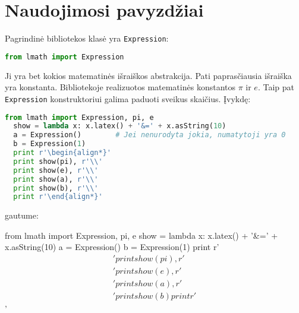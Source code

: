 \chapter{Naudojimosi pavyzdžiai}

Pagrindinė bibliotekos klasė yra \verb|Expression|: 
\begin{lstlisting}[language=python]
  from lmath import Expression
\end{lstlisting}
Ji yra bet kokios matematinės išraiškos abstrakcija. Pati paprasčiausia
išraiška yra konstanta. Bibliotekoje realizuotos matematinės konstantos
$\pi$ ir $e$. Taip pat \verb|Expression| konstruktoriui galima paduoti
sveikus skaičius. Įvykdę:
\begin{lstlisting}[language=python]
  from lmath import Expression, pi, e
  show = lambda x: x.latex() + '&=' + x.asString(10)
  a = Expression()        # Jei nenurodyta jokia, numatytoji yra 0
  b = Expression(1)
  print r'\begin{align*}'
  print show(pi), r'\\'
  print show(e), r'\\'
  print show(a), r'\\'
  print show(b), r'\\'
  print r'\end{align*}'
\end{lstlisting}
gautume:

\begin{python}%
from lmath import Expression, pi, e
show = lambda x: x.latex() + '&=' + x.asString(10)
a = Expression()
b = Expression(1)
print r'\begin{align*}'
print show(pi), r'\\'
print show(e), r'\\'
print show(a), r'\\'
print show(b)
print r'\end{align*}'
\end{python}

